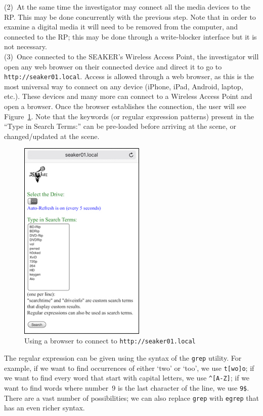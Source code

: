 \documentclass[12pt]{article}
\begin{document}
(2)~At the same time the investigator may connect all the media
devices to the RP. This may be done concurrently with the previous
step. Note that in order to examine a digital media it will need to be
removed from the
computer, and connected to the RP; this may be done through a
write-blocker interface but it is not necessary.\\

(3)~Once connected to the SEAKER's Wireless Access Point,
the investigator will open any
web browser on their connected device and direct it to go to
{\tt http://seaker01.local}. Access is allowed
through a web browser, as this is the most universal way to connect
on any device (iPhone, iPad, Android, laptop, etc.).  These
devices and many more can connect to a Wireless Access Point
and open a browser.  Once the browser establishes the
connection, the user will see Figure~\ref{fig:screen-2}. Note that the
keywords (or regular expression patterns) present in the ``Type in
Search Terms:'' can be pre-loaded before arriving at the scene, or
changed/updated at the scene.\\

\begin{figure}[H]
  \begin{center}
  \includegraphics[width=6cm]{images/seaker-hh-screen-2.jpg}
  \caption{Using a browser to connect to {\tt http://seaker01.local}}
  \label{fig:screen-2}
  \end{center}
\end{figure}

The regular expression can be given using the syntax of the
\verb|grep| utility. For example, if we want to find occurrences of
either `two' or `too', we use \verb|t[wo]o|; if we want to find every
word that start with capital letters, we use \verb|^[A-Z]|; if we want
to find words where number~9 is the last character of the line, we use
\verb|9$|. There are a vast number of possibilities; we can also
replace \verb|grep| with \verb|egrep| that has an even richer syntax.\\
\end{document}
